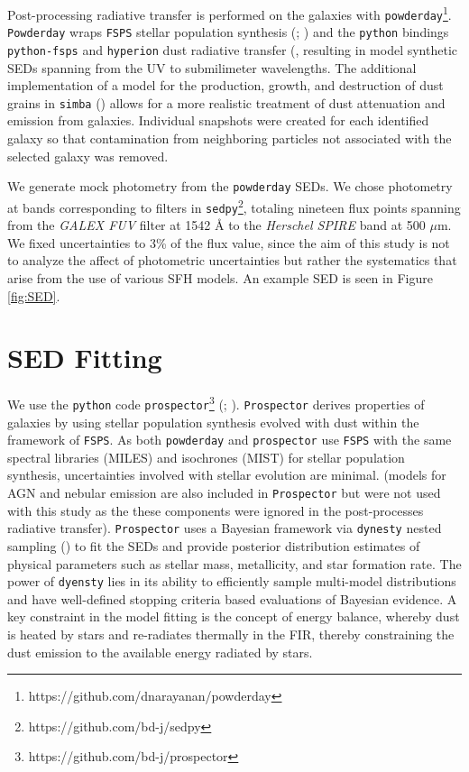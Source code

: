 \documentclass[twocolumn]{aastex62}
\begin{document}
Post-processing radiative transfer is performed on the galaxies with \texttt{powderday}\footnote{https://github.com/dnarayanan/powderday}. \texttt{Powderday} wraps \texttt{FSPS} stellar population synthesis (\cite{conroy_propagation_2009}; \cite{conroy_propagation_2010}) and the \texttt{python} bindings \texttt{python-fsps} and \texttt{hyperion} dust radiative transfer (\cite{robitaille_hyperion:_2011}, resulting in model synthetic SEDs spanning from the UV to submilimeter wavelengths. The additional implementation of a model for the production, growth, and destruction of dust grains in \texttt{simba} (\cite{li_dust--gas_2019}) allows for a more realistic treatment of dust attenuation and emission from galaxies. Individual snapshots were created for each identified galaxy so that contamination from neighboring particles not associated with the selected galaxy was removed. 

We generate mock photometry from the \texttt{powderday} SEDs. We chose photometry at bands corresponding to filters in \texttt{sedpy}\footnote{https://github.com/bd-j/sedpy}, totaling nineteen flux points spanning from the \textit{GALEX FUV} filter at 1542 {\AA} to the \textit{Herschel SPIRE} band at 500 $\mu$m. We fixed uncertainties to 3\% of the flux value, since the aim of this study is not to analyze the affect of photometric uncertainties but rather the systematics that arise from the use of various SFH models. An example SED is seen in Figure \ref{fig:SED}.



\section{SED Fitting}


We use the \texttt{python} code \texttt{prospector}\footnote{https://github.com/bd-j/prospector} (\cite{leja_deriving_2017}; \cite{leja_how_2018}). \texttt{Prospector} derives properties of galaxies by using stellar population synthesis evolved with dust within the framework of \texttt{FSPS}. As both \texttt{powderday} and \texttt{prospector} use \texttt{FSPS} with the same spectral libraries (MILES) and isochrones (MIST) for stellar population synthesis, uncertainties involved with stellar evolution are minimal. (models for AGN and nebular emission are also included in \texttt{Prospector} but were not used with this study as the these components were ignored in the post-processes radiative transfer). \texttt{Prospector} uses a Bayesian framework via \texttt{dynesty} nested sampling (\cite{speagle_dynesty:_2019}) to fit the SEDs and provide posterior distribution estimates of physical parameters such as stellar mass, metallicity, and star formation rate. The power of \texttt{dyensty} lies in its ability to efficiently sample multi-model distributions and have well-defined stopping criteria based evaluations of Bayesian evidence. A key constraint in the model fitting is the concept of energy balance, whereby dust is heated by stars and re-radiates thermally in the FIR, thereby constraining the dust emission to the available energy radiated by stars.
\end{document}
